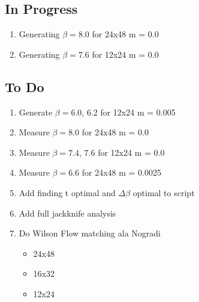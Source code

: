 \documentclass[11pt]{article}
\begin{document}
\subsection{In Progress} 
\begin{enumerate}
  \item Generating $\beta=8.0$ for 24x48 m = 0.0
  \item Generating $\beta=7.6$ for 12x24 m = 0.0
\end{enumerate}

\subsection{To Do}

\begin{enumerate}
  \item Generate $\beta=6.0$, 6.2 for 12x24 m = 0.005
  \item Measure $\beta=8.0$ for 24x48 m = 0.0
  \item Measure $\beta=7.4$, 7.6 for 12x24 m = 0.0
  \item Measure $\beta=6.6$ for 24x48 m = 0.0025
  \item Add finding t optimal and $\Delta\beta$ optimal to script
  \item Add full jackknife analysis
  \item Do Wilson Flow matching ala Nogradi
    \begin{itemize}
      \item 24x48
      \item 16x32
      \item 12x24
    \end{itemize}
\end{enumerate}
\end{document}

